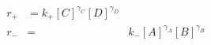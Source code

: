 \begin{eqnarray}
r_+  & =  k_+[C]^{\gamma_C}[D]^{\gamma_D} \\
r_-  & = & k_-[A]^{\gamma_A}[B]^{\gamma_B} \\
\end{eqnarray}